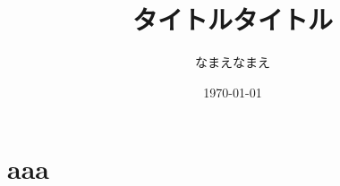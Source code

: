 \documentclass[uplatex,a4paper,11pt]{jsarticle} %
\title{タイトルタイトル}
\author{なまえなまえ}
\date{\today}
\numberwithin{equation}{section}     %
\begin{document}

\section{aaa}






% 
\end{document}
